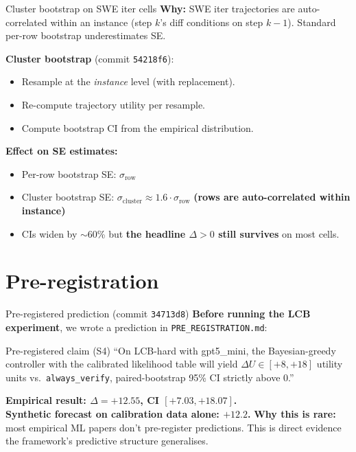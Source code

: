 \documentclass[10pt]{beamer}
\newcommand{\good}[1]{\textcolor{accentGreen}{\textbf{#1}}}
\newcommand{\warn}[1]{\textcolor{accentOrange}{\textbf{#1}}}
\newcommand{\info}[1]{\textcolor{primaryBlue}{\textbf{#1}}}
\begin{document}
\begin{frame}{Cluster bootstrap on SWE iter cells}
\vspace{0.4cm}
\warn{Why:} SWE iter trajectories are auto-correlated within an instance
(step $k$'s diff conditions on step $k-1$). Standard per-row bootstrap
underestimates SE.

\good{Cluster bootstrap} (commit \texttt{54218f6}):
\begin{itemize}
\item Resample at the \emph{instance} level (with replacement).
\item Re-compute trajectory utility per resample.
\item Compute bootstrap CI from the empirical distribution.
\end{itemize}

\info{Effect on SE estimates:}
\begin{itemize}
\item Per-row bootstrap SE: $\sigma_\text{row}$
\item Cluster bootstrap SE: $\sigma_\text{cluster} \approx 1.6 \cdot \sigma_\text{row}$ \warn{(rows are auto-correlated within instance)}
\item CIs widen by $\sim$60\% but \good{the headline $\Delta > 0$ still
  survives} on most cells.
\end{itemize}
\end{frame}


\section{Pre-registration}
\hypertarget{out:10}{}

\begin{frame}{Pre-registered prediction (commit \texttt{34713d8})}
\vspace{0.4cm}
\info{Before running the LCB experiment}, we wrote a prediction in
\texttt{PRE\_REGISTRATION.md}:
\vspace{0.2cm}
\begin{exampleblock}{Pre-registered claim (S4)}
``On LCB-hard with gpt5\_mini, the Bayesian-greedy controller with the
calibrated likelihood table will yield $\Delta U \in [+8, +18]$ utility units
vs.\ \texttt{always\_verify}, paired-bootstrap 95\% CI strictly above 0.''
\end{exampleblock}
\vspace{0.3cm}
\good{Empirical result: $\Delta = +12.55$, CI $[+7.03, +18.07]$.} \\
\good{Synthetic forecast on calibration data alone: $+12.2$.}
\vspace{0.3cm}
\warn{Why this is rare:} most empirical ML papers don't pre-register
predictions. This is direct evidence the framework's predictive structure
generalises.
\end{frame}
\end{document}

